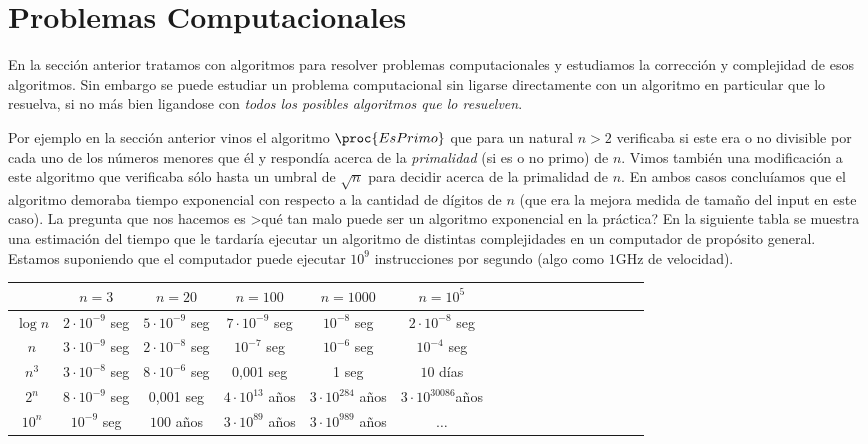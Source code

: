 \section{Problemas Computacionales}

En la sección anterior tratamos con algoritmos para resolver problemas computacionales y estudiamos la corrección y complejidad de esos algoritmos.
Sin embargo se puede estudiar un problema computacional sin ligarse directamente con un algoritmo en particular que lo resuelva, si no más bien ligandose con \emph{todos los posibles algoritmos que lo resuelven}.

Por ejemplo en la sección anterior vinos el algoritmo $\proc{EsPrimo}$ que para un natural $n>2$ verificaba si este era o no divisible por cada uno de los números menores que él y respondía acerca de la \emph{primalidad} (si es o no primo) de $n$.
Vimos también una modificación a este algoritmo que verificaba sólo hasta un umbral de $\sqrt n$ para decidir acerca de la primalidad de $n$.
En ambos casos concluíamos que el algoritmo demoraba tiempo exponencial con respecto a la cantidad de dígitos de $n$ (que era la mejora medida de tamaño del input en este caso).
La pregunta que nos hacemos es >qué tan malo puede ser un algoritmo exponencial en la práctica?
En la siguiente tabla se muestra una estimación del tiempo que le tardaría ejecutar un algoritmo de distintas complejidades en un computador de propósito general.
Estamos suponiendo que el computador puede ejecutar $10^9$ instrucciones por segundo (algo como $1$GHz de velocidad).
\begin{center}
\begin{tabular}{c|cccccccccccccccc}
 & $n=3$ & $n=20$ & $n=100$ & $n=1000$ & $n=10^5$ \\ \hline
$\log n$ & $2\cdot 10^{-9}$ seg & $5\cdot 10^{-9}$ seg & $7\cdot 10^{-9}$ seg & $10^{-8}$ seg& $2\cdot 10^{-8}$ seg \\
$n$ & $3\cdot 10^{-9}$ seg&$2\cdot 10^{-8}$ seg&$10^{-7}$ seg&$10^{-6}$ seg&$10^{-4}$ seg \\
$n^3$&$3\cdot 10^{-8}$ seg&$8\cdot 10^{-6}$ seg&0,001 seg&1 seg&$10$ días \\
$2^n$&$8\cdot 10^{-9}$ seg&0,001 seg&$4\cdot 10^{13}$ años&$3\cdot 10^{284}$ años&$3\cdot 10^{30086} $años\\
$10^n$&$10^{-9}$ seg&$100$ años&$3\cdot 10^{89}$ años&$3\cdot 10^{989}$ años&$\ldots$
\end{tabular}
\end{center}

